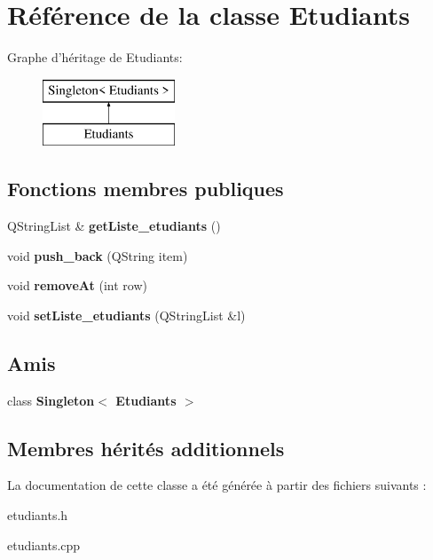 \hypertarget{class_etudiants}{\section{Référence de la classe Etudiants}
\label{class_etudiants}
}
Graphe d'héritage de Etudiants\+:\begin{figure}[H]
\begin{center}
\leavevmode
\includegraphics[height=2.000000cm]{class_etudiants}
\end{center}
\end{figure}
\subsection*{Fonctions membres publiques}
\begin{DoxyCompactItemize}
\item 
\hypertarget{class_etudiants_a872d4a8dd0354322e067a67d0c3b67a1}{Q\+String\+List \& {\bfseries get\+Liste\+\_\+etudiants} ()}\label{class_etudiants_a872d4a8dd0354322e067a67d0c3b67a1}

\item 
\hypertarget{class_etudiants_aad7ffc509ea5ab7c0e4627bf5da1081d}{void {\bfseries push\+\_\+back} (Q\+String item)}\label{class_etudiants_aad7ffc509ea5ab7c0e4627bf5da1081d}

\item 
\hypertarget{class_etudiants_adfc202eb11688821712cf773365ac035}{void {\bfseries remove\+At} (int row)}\label{class_etudiants_adfc202eb11688821712cf773365ac035}

\item 
\hypertarget{class_etudiants_afb5396339b61c6a026a1e9b87a1aecf6}{void {\bfseries set\+Liste\+\_\+etudiants} (Q\+String\+List \&l)}\label{class_etudiants_afb5396339b61c6a026a1e9b87a1aecf6}

\end{DoxyCompactItemize}
\subsection*{Amis}
\begin{DoxyCompactItemize}
\item 
\hypertarget{class_etudiants_a6956ca5228b95aa3879716fff6302476}{class {\bfseries Singleton$<$ Etudiants $>$}}\label{class_etudiants_a6956ca5228b95aa3879716fff6302476}

\end{DoxyCompactItemize}
\subsection*{Membres hérités additionnels}


La documentation de cette classe a été générée à partir des fichiers suivants \+:\begin{DoxyCompactItemize}
\item 
etudiants.\+h\item 
etudiants.\+cpp\end{DoxyCompactItemize}
